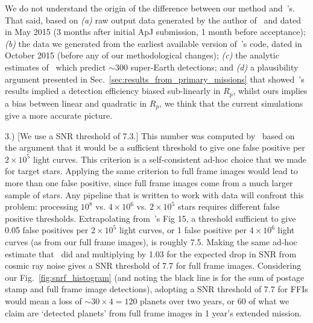 \begin{description}
	We do not understand the origin of the difference between our method and~'s.
	That said, based on 
	\textit{(a)} raw output data generated by the author of~ and dated in May 2015 (3 months after initial ApJ submission, 1 month before acceptance); 
	\textit{(b)} the data we generated from the earliest available version of~'s code, dated in October 2015 (before any of our methodological changes); 
	\textit{(c)} the analytic estimates of~\citet{winn_searchable_2013} which predict $\sim300$ super-Earth detections;
	and \textit{(d)} a plausibility argument presented in Sec.~\ref{sec:results_from_primary_missions} that showed~'s results implied a detection efficiency biased sub-linearly in $R_p$, whilst ours implies a bias between linear and quadratic in $R_p$,
	we think that the current simulations give a more accurate picture.
	
	\item 3.) [We use a SNR threshold of 7.3.] This number was computed by~ based on the argument that it would be a sufficient threshold to give one false positive per $2\times10^5$ light curves.
	This criterion is a self-consistent ad-hoc choice that we made for target stars.
	Applying the same criterion to full frame images would lead to more than one false positive, since full frame images come from a much larger sample of stars.
	Any pipeline that is written to work with \tess data will confront this problem:
	processing $10^8$ vs. $4\times10^6$ vs. $2\times10^5$ stars requires different false positive thresholds.
	Extrapolating from~'s Fig 15, a threshold sufficient to give 0.05 false positives per $2\times10^5$ light curves, or 1 false positive per $4\times10^6$ light curves (as from our full frame images), is roughly 7.5.
	Making the same ad-hoc estimate that~ did and multiplying by 1.03 for the expected drop in SNR from cosmic ray noise gives a SNR threshold of 7.7 for full frame images.
	Considering our Fig.~\ref{fig:snrf_histogram} (and noting the black line is for the sum of postage stamp and full frame image detections), adopting a SNR threshold of 7.7 for FFIs would mean a loss of $\sim30\times4=120$ planets over two years, or 60 of what we claim are `detected planets' from full frame images in 1 year's extended mission.	
	

\end{description}
